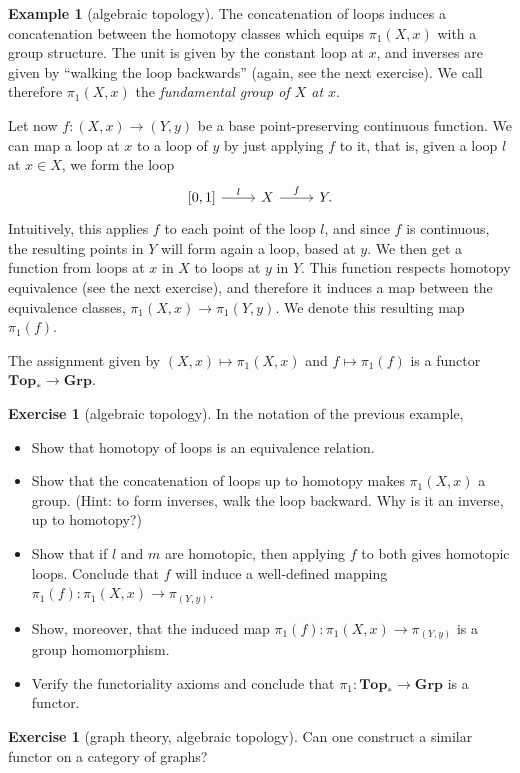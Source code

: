 \documentclass[12pt,oneside]{scrbook}
\numberwithin{equation}{section}
\theoremstyle{plain}
\theoremstyle{definition}
\newtheorem{eg}[thm]{Example}
\newtheorem{ex}[thm]{Exercise}
\newcommand{\cat}[1]{{\mathbf{#1}}} %
\newcommand{\ar}[2][]{\arrow{#2}{#1}}
\newcommand{\Grp}{\cat{Grp}}
\DeclareMathOperator{\1}{\mathbbm{1}}
\DeclareMathOperator{\2}{\mathbbm{2}}
\let\originalleft\left
\let\originalright\right
\renewcommand{\left}{\mathopen{}\mathclose\bgroup\originalleft}
\renewcommand{\right}{\aftergroup\egroup\originalright}
\begin{document}
\begin{eg}[algebraic topology]
 The concatenation of loops induces a concatenation between the homotopy classes which equips $\pi_1(X,x)$ with a group structure. The unit is given by the constant loop at $x$, and inverses are given by ``walking the loop backwards'' (again, see the next exercise). We call therefore $\pi_1(X,x)$ the \emph{fundamental group of $X$ at $x$}. 
 
 Let now $f:(X,x)\to(Y,y)$ be a base point-preserving continuous function. We can map a loop at $x$ to a loop of $y$ by just applying $f$ to it, that is, given a loop $l$ at $x\in X$, we form the loop
 $$
 \begin{tikzcd}
  \left[0,1\right] \ar{r}{l} & X \ar{r}{f} & Y . 
 \end{tikzcd}
 $$
 Intuitively, this applies $f$ to each point of the loop $l$, and since $f$ is continuous, the resulting points in $Y$ will form again a loop, based at $y$. We then get a function from loops at $x$ in $X$ to loops at $y$ in $Y$. This function respects homotopy equivalence (see the next exercise), and therefore it induces a map between the equivalence classes, $\pi_1(X,x) \to \pi_1(Y,y)$. We denote this resulting map $\pi_1(f)$.
 
 The assignment given by $(X,x)\mapsto \pi_1(X,x)$ and $f\mapsto \pi_1(f)$ is a functor $\cat{Top_*}\to\Grp$.
\end{eg}

\begin{ex}[algebraic topology]
In the notation of the previous example,
\begin{itemize}
 \item Show that homotopy of loops is an equivalence relation.
 \item Show that the concatenation of loops up to homotopy makes $\pi_1(X,x)$ a group. (Hint: to form inverses, walk the loop backward. Why is it an inverse, up to homotopy?)
 \item Show that if $l$ and $m$ are homotopic, then applying $f$ to both gives homotopic loops. Conclude that $f$ will induce a well-defined mapping $\pi_1(f): \pi_1(X,x) \to \pi_(Y,y)$.
 \item Show, moreover, that the induced map $\pi_1(f): \pi_1(X,x) \to \pi_(Y,y)$ is a group homomorphism. 
 \item Verify the functoriality axioms and conclude that $\pi_1:\cat{Top_*}\to\Grp$ is a functor.
\end{itemize}
\end{ex}

\begin{ex}[graph theory, algebraic topology]
 Can one construct a similar functor on a category of graphs?
\end{ex}
\end{document}
